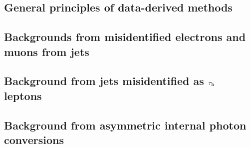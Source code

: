 \subsection{General principles of data-derived methods}


\subsection{Backgrounds from misidentified electrons and muons from jets}
\label{sec:LightLeptFakeRate}


\subsection{Background from jets misidentified as \texorpdfstring{$\tau_\textrm{h}$}{hadronic tau} leptons}
\label{sec:HadronicTauFakeRate}


\subsection{Background from asymmetric internal photon conversions}
\label{sec:AsymmeticInternalPhotonConversionFakeRate}